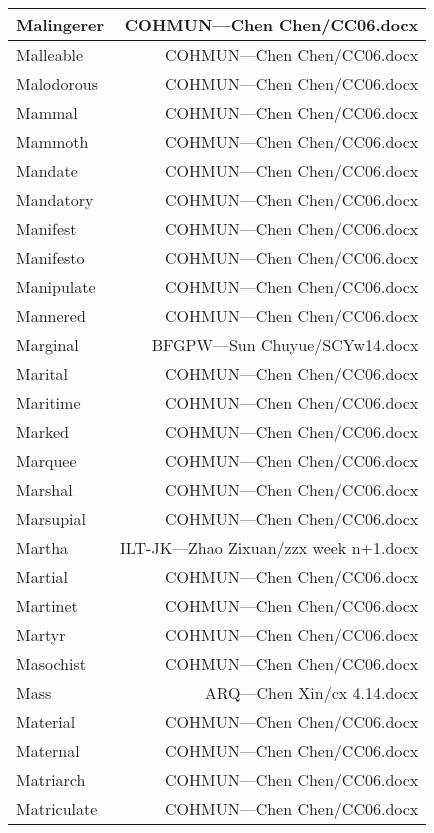 \documentclass{article}
\begin{document}
\begin{center}
\begin{longtable}{|l|r|}
Malingerer  &  COHMUN---Chen Chen/CC06.docx\\  
\hline
Malleable  &  COHMUN---Chen Chen/CC06.docx\\  
\hline
Malodorous  &  COHMUN---Chen Chen/CC06.docx\\  
\hline
Mammal  &  COHMUN---Chen Chen/CC06.docx\\  
\hline
Mammoth  &  COHMUN---Chen Chen/CC06.docx\\  
\hline
Mandate  &  COHMUN---Chen Chen/CC06.docx\\  
\hline
Mandatory  &  COHMUN---Chen Chen/CC06.docx\\  
\hline
Manifest  &  COHMUN---Chen Chen/CC06.docx\\  
\hline
Manifesto  &  COHMUN---Chen Chen/CC06.docx\\  
\hline
Manipulate  &  COHMUN---Chen Chen/CC06.docx\\  
\hline
Mannered  &  COHMUN---Chen Chen/CC06.docx\\  
\hline
Marginal  &  BFGPW---Sun Chuyue/SCYw14.docx\\  
\hline
Marital  &  COHMUN---Chen Chen/CC06.docx\\  
\hline
Maritime  &  COHMUN---Chen Chen/CC06.docx\\  
\hline
Marked  &  COHMUN---Chen Chen/CC06.docx\\  
\hline
Marquee  &  COHMUN---Chen Chen/CC06.docx\\  
\hline
Marshal  &  COHMUN---Chen Chen/CC06.docx\\  
\hline
Marsupial  &  COHMUN---Chen Chen/CC06.docx\\  
\hline
Martha  &  ILT-JK---Zhao Zixuan/zzx week n+1.docx\\  
\hline
Martial  &  COHMUN---Chen Chen/CC06.docx\\  
\hline
Martinet  &  COHMUN---Chen Chen/CC06.docx\\  
\hline
Martyr  &  COHMUN---Chen Chen/CC06.docx\\  
\hline
Masochist  &  COHMUN---Chen Chen/CC06.docx\\  
\hline
Mass  &  ARQ---Chen Xin/cx 4.14.docx\\  
\hline
Material  &  COHMUN---Chen Chen/CC06.docx\\  
\hline
Maternal  &  COHMUN---Chen Chen/CC06.docx\\  
\hline
Matriarch  &  COHMUN---Chen Chen/CC06.docx\\  
\hline
Matriculate  &  COHMUN---Chen Chen/CC06.docx\\  

\end{longtable}
\end{center}
\end{document}
